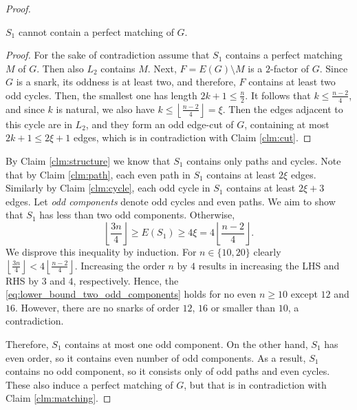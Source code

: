 \begin{proof}
    \begin{claim}
        $S_1$ cannot contain a perfect matching of $G$. \label{clm:matching}
    \end{claim}
    \begin{proof}
        For the sake of contradiction assume that $S_1$ contains a perfect matching $M$ of $G$. Then also $L_2$ contains $M$. Next, $F=E(G)\setminus M$ is a $2$-factor of $G$. Since $G$ is a snark, its oddness is at least two, and therefore, $F$ contains at least two odd cycles. Then, the smallest one has length $2k+1\leq\frac n2$. It follows that $k\leq\frac{n-2}{4}$, and since $k$ is natural, we also have $k\leq\left\lfloor\frac{n-2}{4}\right\rfloor=\xi$. Then the edges adjacent to this cycle are in $L_2$, and they form an odd edge-cut of $G$, containing at most $2k+1\leq 2\xi+1$ edges, which is in contradiction with Claim \ref{clm:cut}.
    \end{proof}

    By Claim \ref{clm:structure} we know that $S_1$ contains only paths and cycles. Note that by Claim \ref{clm:path}, each even path in $S_1$ contains at least $2\xi$ edges. Similarly by Claim \ref{clm:cycle}, each odd cycle in $S_1$ contains at least $2\xi+3$ edges. Let \emph{odd components} denote odd cycles and even paths. We aim to show that $S_1$ has less than two odd components. Otherwise,
    \begin{equation}
    	\left\lfloor\frac{3n}{4}\right\rfloor \geq E(S_1) \geq 4\xi=4\left\lfloor\frac{n-2}{4}\right\rfloor.\label{eq:lower_bound_two_odd_components}
    \end{equation}
    We disprove this inequality by induction. For $n\in\{10, 20\}$ clearly $\left\lfloor\frac{3n}{4}\right\rfloor<4\left\lfloor\frac{n-2}{4}\right\rfloor$. Increasing the order $n$ by $4$ results in increasing the LHS and RHS by $3$ and $4$, respectively. Hence, the \eqref{eq:lower_bound_two_odd_components} holds for no even $n\geq 10$ except $12$ and $16$. However, there are no snarks of order $12$, $16$ or smaller than $10$, a contradiction.
    
    Therefore, $S_1$ contains at most one odd component. On the other hand, $S_1$ has even order, so it contains even number of odd components. As a result, $S_1$ contains no odd component, so it consists only of odd paths and even cycles. These also induce a perfect matching of $G$, but that is in contradiction with Claim \ref{clm:matching}.
    \renewcommand{\qedsymbol}{$\square$}
\end{proof}


